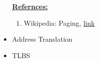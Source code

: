 \documentclass[12pt]{article}
\begin{document}
\begin{itemize}
    \bigskip

    \underline{\textbf{Refernces:}}

    \bigskip

    \begin{enumerate}[1)]
        \item Wikipedia: Paging, \href{https://en.wikipedia.org/wiki/Paging}{link}
    \end{enumerate}
    \item Address Translation
    \item TLBS
\end{itemize}
\end{document}
